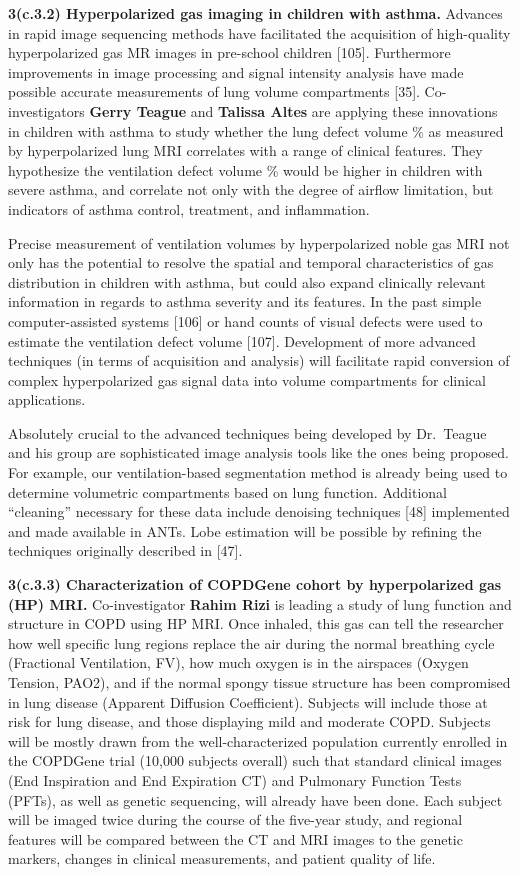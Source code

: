 \documentclass[11pt,]{article}
\begin{document}
\textbf{3(c.3.2) Hyperpolarized gas imaging in children with asthma.}
Advances in rapid image sequencing methods have facilitated the
acquisition of high-quality hyperpolarized gas MR images in pre-school
children {[}105{]}. Furthermore improvements in image processing and
signal intensity analysis have made possible accurate measurements of
lung volume compartments {[}35{]}. Co-investigators \textbf{Gerry
Teague} and \textbf{Talissa Altes} are applying these innovations in
children with asthma to study whether the lung defect volume \% as
measured by hyperpolarized lung MRI correlates with a range of clinical
features. They hypothesize the ventilation defect volume \% would be
higher in children with severe asthma, and correlate not only with the
degree of airflow limitation, but indicators of asthma control,
treatment, and inflammation.

Precise measurement of ventilation volumes by hyperpolarized noble gas
MRI not only has the potential to resolve the spatial and temporal
characteristics of gas distribution in children with asthma, but could
also expand clinically relevant information in regards to asthma
severity and its features. In the past simple computer-assisted systems
{[}106{]} or hand counts of visual defects were used to estimate the
ventilation defect volume {[}107{]}. Development of more advanced
techniques (in terms of acquisition and analysis) will facilitate rapid
conversion of complex hyperpolarized gas signal data into volume
compartments for clinical applications.

Absolutely crucial to the advanced techniques being developed by
Dr.~Teague and his group are sophisticated image analysis tools like the
ones being proposed. For example, our ventilation-based segmentation
method is already being used to determine volumetric compartments based
on lung function. Additional ``cleaning'' necessary for these data
include denoising techniques {[}48{]} implemented and made available in
ANTs. Lobe estimation will be possible by refining the techniques
originally described in {[}47{]}.

\textbf{3(c.3.3) Characterization of COPDGene cohort by hyperpolarized
gas (HP) MRI.} Co-investigator \textbf{Rahim Rizi} is leading a study of
lung function and structure in COPD using HP MRI. Once inhaled, this gas
can tell the researcher how well specific lung regions replace the air
during the normal breathing cycle (Fractional Ventilation, FV), how much
oxygen is in the airspaces (Oxygen Tension, PAO2), and if the normal
spongy tissue structure has been compromised in lung disease (Apparent
Diffusion Coefficient). Subjects will include those at risk for lung
disease, and those displaying mild and moderate COPD. Subjects will be
mostly drawn from the well-characterized population currently enrolled
in the COPDGene trial (10,000 subjects overall) such that standard
clinical images (End Inspiration and End Expiration CT) and Pulmonary
Function Tests (PFTs), as well as genetic sequencing, will already have
been done. Each subject will be imaged twice during the course of the
five-year study, and regional features will be compared between the CT
and MRI images to the genetic markers, changes in clinical measurements,
and patient quality of life.
\end{document}
